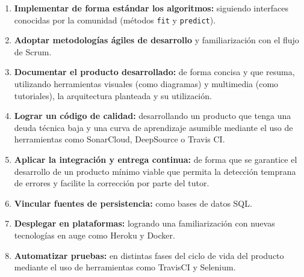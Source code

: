 \begin{enumerate}
	\item \textbf{Implementar de forma estándar los algoritmos:} siguiendo interfaces conocidas por la comunidad (métodos \texttt{fit} y \texttt{predict}).
	\item \textbf{Adoptar metodologías ágiles de desarrollo} y familiarización con el flujo de Scrum.
	\item \textbf{Documentar el producto desarrollado:} de forma concisa y que resuma, utilizando herramientas visuales (como diagramas) y multimedia (como tutoriales), la arquitectura planteada y su utilización.
	\item \textbf{Lograr un código de calidad:} desarrollando un producto que tenga una deuda técnica baja y una curva de aprendizaje asumible mediante el uso de herramientas como SonarCloud, DeepSource o Travis CI.
	\item \textbf{Aplicar la integración y entrega continua:} de forma que se garantice el desarrollo de un producto mínimo viable que permita la detección temprana de errores y facilite la corrección por parte del tutor.
	\item \textbf{Vincular fuentes de persistencia:} como bases de datos SQL.
	\item \textbf{Desplegar en plataformas:} logrando una familiarización con nuevas tecnologías en auge como Heroku y Docker.
	\item \textbf{Automatizar pruebas:} en distintas fases del ciclo de vida del producto mediante el uso de herramientas como TravisCI y Selenium.
	
\end{enumerate}